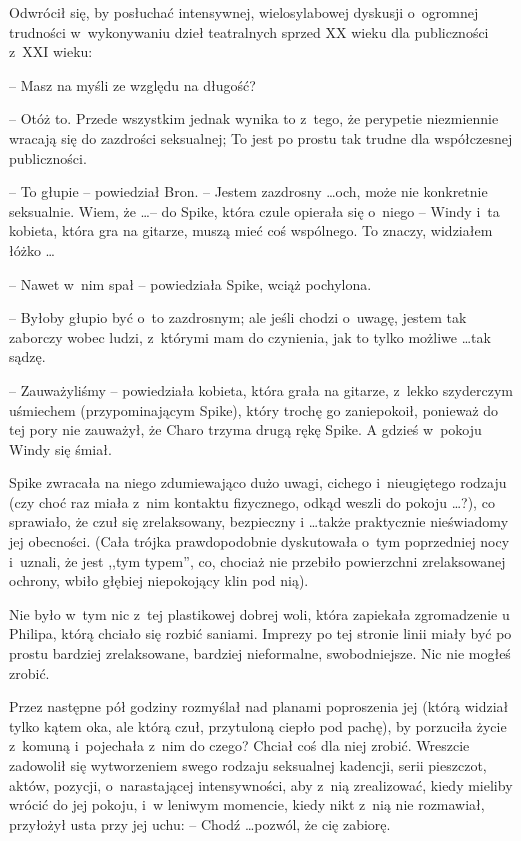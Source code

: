 \documentclass[oneside,polish,11pt,rmheadings]{mwbk}
\begin{document}
Odwrócił się, by posłuchać intensywnej, wielosylabowej dyskusji o~ogromnej trudności w~wykonywaniu dzieł teatralnych sprzed XX wieku dla publiczności z~XXI wieku: 

-- Masz na myśli ze względu na długość? 

-- Otóż to. Przede wszystkim jednak wynika to z~tego, że perypetie niezmiennie wracają się do zazdrości seksualnej; To jest po prostu tak trudne dla współczesnej publiczności. 

-- To głupie -- powiedział Bron. -- Jestem zazdrosny \ldots  och, może nie konkretnie seksualnie. Wiem, że \ldots  -- do Spike, która czule opierała się o~niego -- Windy i~ta kobieta, która gra na gitarze, muszą mieć coś wspólnego. To znaczy, widziałem łóżko \ldots  

-- Nawet w~nim spał -- powiedziała Spike, wciąż pochylona. 

-- Byłoby głupio być o~to zazdrosnym; ale jeśli chodzi o~uwagę, jestem tak zaborczy wobec ludzi, z~którymi mam do czynienia, jak to tylko możliwe \ldots  tak sądzę.   

-- Zauważyliśmy -- powiedziała kobieta, która grała na gitarze, z~lekko szyderczym uśmiechem (przypominającym Spike), który trochę go zaniepokoił, ponieważ do tej pory nie zauważył, że Charo trzyma drugą rękę Spike. A gdzieś w~pokoju Windy się śmiał. 

Spike zwracała na niego zdumiewająco dużo uwagi, cichego i~nieugiętego rodzaju (czy choć raz miała z~nim kontaktu fizycznego, odkąd weszli do pokoju \ldots ?), co sprawiało, że czuł się zrelaksowany, bezpieczny i \ldots  także praktycznie nieświadomy jej obecności. (Cała trójka prawdopodobnie dyskutowała o~tym poprzedniej nocy i~uznali, że jest ,,tym typem'', co, chociaż nie przebiło powierzchni zrelaksowanej ochrony, wbiło głębiej niepokojący klin pod nią). 

Nie było w~tym nic z~tej plastikowej dobrej woli, która zapiekała zgromadzenie u Philipa, którą chciało się rozbić saniami. Imprezy po tej stronie linii miały być po prostu bardziej zrelaksowane, bardziej nieformalne, swobodniejsze. Nic nie mogłeś zrobić. 

Przez następne pół godziny rozmyślał nad planami poproszenia jej (którą widział tylko kątem oka, ale którą czuł, przytuloną ciepło pod pachę), by porzuciła życie z~komuną i~pojechała z~nim do czego? Chciał coś dla niej zrobić. Wreszcie zadowolił się wytworzeniem swego rodzaju seksualnej kadencji, serii pieszczot, aktów, pozycji, o~narastającej intensywności, aby z~nią zrealizować, kiedy mieliby wrócić do jej pokoju, i~w leniwym momencie, kiedy nikt z~nią nie rozmawiał, przyłożył usta przy jej uchu:  -- Chodź \ldots  pozwól, że cię zabiorę. 
\end{document}
